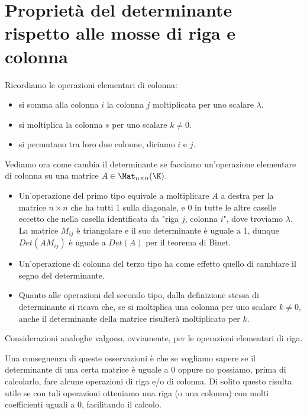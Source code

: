 \section{Proprietà del determinante rispetto alle mosse di riga e colonna}
Ricordiamo le operazioni elementari di colonna:
\begin{itemize}
	\item si somma alla colonna $i$ la colonna $j$ moltiplicata per uno
	      scalare $\lambda$.
	\item si moltiplica la colonna $s$ per uno scalare $k \neq 0$.
	\item si permutano tra loro due colonne, diciamo $i$ e $j$.
\end{itemize}

Vediamo ora come cambia il determinante se facciamo un'operazione elementare di colonna
su una matrice $A \in \Mat_{n \times n}(\K)$.
\begin{itemize}
	\item Un'operazione del primo tipo equivale a moltiplicare $A$ a destra per la
	      matrice $n \times n$ che ha tutti 1 sulla diagonale, e 0 in tutte le altre
	      caselle eccetto che nella casella identificata da "riga $j$, colonna $i$",
	      dove troviamo $\lambda$. La matrice $M_{ij}$ è triangolare e il suo
	      determinante è uguale a 1, dunque $Det(AM_{ij})$ è uguale a $Det(A)$ per
	      il teorema di Binet.
	\item Un'operazione di colonna del terzo tipo ha come
	      effetto quello di cambiare il segno del determinante.
	\item Quanto alle operazioni del secondo tipo, dalla definizione stessa di
	      determinante si ricava che, se si moltiplica una colonna per uno scalare
	      $k \neq 0$, anche il determinante della matrice risulterà moltiplicato
	      per $k$.
\end{itemize}

Considerazioni analoghe valgono, ovviamente, per le operazioni elementari di
riga.

Una conseguenza di queste osservazioni è che se vogliamo sapere se il
determinante di una certa matrice è uguale a 0 oppure no possiamo,
prima di calcolarlo, fare alcune operazioni di riga e/o di colonna.
Di solito questo risulta utile se con tali operazioni otteniamo una riga
(o una colonna) con molti coefficienti uguali a 0, facilitando il calcolo.